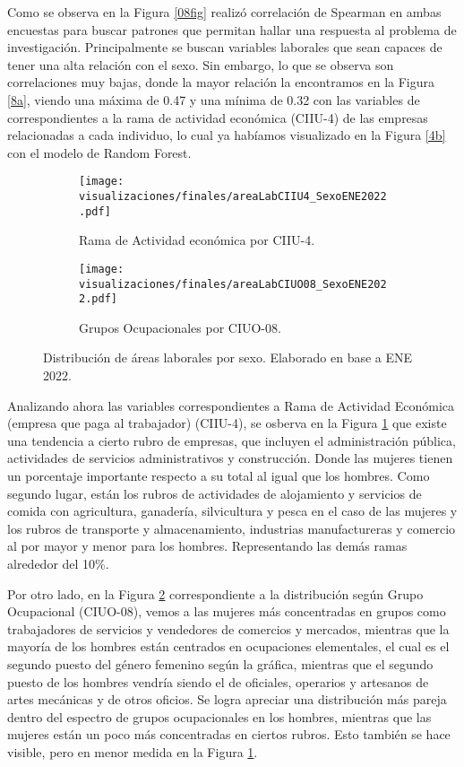 \FloatBarrier

Como se observa en la Figura \ref{08fig} realizó correlación de Spearman en ambas encuestas para buscar patrones que permitan hallar una respuesta al problema de investigación. Principalmente se buscan variables laborales que sean capaces de tener una alta relación con el sexo. Sin embargo, lo que se observa son correlaciones muy bajas, donde la mayor relación la encontramos en la Figura \ref{8a}, viendo una máxima de 0.47 y una mínima de 0.32 con las variables de correspondientes a la rama de actividad económica (CIIU-4) de las empresas relacionadas a cada individuo, lo cual ya habíamos visualizado en la Figura \ref{4b} con el modelo de Random Forest.

\FloatBarrier

\begin{figure}[htbp]
	\centering
	\begin{subfigure}[b]{0.49\textwidth}
		\centering
		\texttt{[image: visualizaciones/finales/areaLabCIIU4\_SexoENE2022.pdf]}
		\caption{Rama de Actividad económica por CIIU-4.}
		\label{9a} 
	\end{subfigure}
	\hfill
	\begin{subfigure}[b]{0.49\textwidth}
		\centering
		\texttt{[image: visualizaciones/finales/areaLabCIUO08\_SexoENE2022.pdf]}
		\caption{Grupos Ocupacionales por CIUO-08.}
		\label{9b}
	\end{subfigure}
	\caption{Distribución de áreas laborales por sexo. Elaborado en base a ENE 2022.}
	\label{09fig}
\end{figure}

\FloatBarrier

Analizando ahora las variables correspondientes a Rama de Actividad Económica (empresa que paga al trabajador) (CIIU-4), se osberva en la Figura \ref{9a} que existe una tendencia a cierto rubro de empresas, que incluyen el administración pública, actividades de servicios administrativos y construcción. Donde las mujeres tienen un porcentaje importante respecto a su total al igual que los hombres. Como segundo lugar, están los rubros de actividades de alojamiento y servicios de comida con agricultura, ganadería, silvicultura y pesca en el caso de las mujeres y los rubros de transporte y almacenamiento, industrias manufactureras y comercio al por mayor y menor para los hombres. Representando las demás ramas alrededor del 10\%.

Por otro lado, en la Figura \ref{9b} correspondiente a la distribución según Grupo Ocupacional (CIUO-08), vemos a las mujeres más concentradas en grupos como trabajadores de servicios y vendedores de comercios y mercados, mientras que la mayoría de los hombres están centrados en ocupaciones elementales, el cual es el segundo puesto del género femenino según la gráfica, mientras que el segundo puesto de los hombres vendría siendo el de oficiales, operarios y artesanos de artes mecánicas y de otros oficios. Se logra apreciar una distribución más pareja dentro del espectro de grupos ocupacionales en los hombres, mientras que las mujeres están un poco más concentradas en ciertos rubros. Esto también se hace visible, pero en menor medida en la Figura \ref{9a}.


